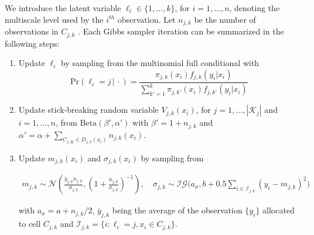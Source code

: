 \documentclass{article} %
\providecommand{\mc}[1]{\mathcal{#1}}
\newcommand{\dd}[1]{{\color{blue}{\it #1}}}
\begin{document}

We introduce the latent variable $\ell_i \in \{1,\ldots,k\}$, for $i=1,\ldots,n$, denoting the multiscale level used by the $i^{th}$ observation.  
Let $n_{j,k}$ be  the number of observations in $C_{j,k}$ . Each Gibbs sampler iteration can be summarized in the following steps:
\dd{not clear to me that this is correct}

\begin{enumerate}
\item Update $\ell_i$ by sampling from the multinomial full conditional with 
\[\mbox{Pr}( \ell_i = j\, |\, \cdot) = \frac{ \pi_{j,k}(x_i)f_{j,k}(y_i|x_i) }{ \sum_{k'=1}^k \pi_{j,k'}(x_i)f_{j,k'}(y_i | x_i) } \label{eq:prS}\]

\item Update stick-breaking random variable $V_{j,k}(x_i)$, for $j=1, \ldots, |\mc{K}_j|$ and $i=1, \ldots, n$, from $\mbox{Beta}(\beta',\alpha')$ with $\beta'=1+n_{j,k}$ and $\alpha'=\alpha+\sum_{C_{j,K} \in D_{j,k}(x_i)} n_{j,k}(x_i)$.

\item Update $m_{j,k}(x_i)$ and $\sigma_{j,k}(x_i)$ by sampling from

\begin{align*}
	m_{j,k} \sim \mc{N}\left(\frac{\bar{y}_{j,k} n_{j,k}}{ \sigma_{j,k}} , (1+\frac{n_{j,k}}{\sigma_{j,k}})^{-1}\right), \quad
	 \sigma_{j,k} \sim \mc{IG}\bigg(a_{\sigma},b+0.5\sum_{i \in \mc{I}_{j,k}} \left(y_{i}-m_{j,k}\right)^2\bigg)	
\end{align*}

with $a_{\sigma}=a+n_{j,k}/2$, $\bar{y}_{j,k}$ being the average of the observation $\{y_i\}$ allocated to cell $C_{j,k}$ and $\mc{I}_{j,k}=\{i : \ell_i=j, x_i \in C_{j,k}\}$.

\end{enumerate}
\end{document}
